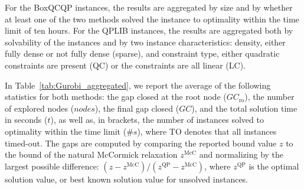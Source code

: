 \documentclass[twoside]{article}
\begin{document}
	For the BoxQCQP instances, the results are aggregated by size and by whether at least one of the two methods solved the instance to optimality within the time limit of ten hours.  For the QPLIB instances, the results are aggregated both by solvability of the instances and by two instance characteristics: density, either fully dense or not fully dense (sparse), and constraint type, either quadratic constraints are present (QC) or the constraints are all linear (LC).
	
	In Table~\ref{tab:Gurobi_aggregated}, %
	we report the average of the following  statistics for both methods: the gap closed at the root node ($GC_{\text{ro}}$), the number of explored nodes ($\textit{nodes}$), the final gap closed ($GC$), and the total solution time in seconds ($t$), as well as, in brackets, the number of instances solved to optimality within the time limit ($\#s$), where TO denotes that all instances timed-out.
	The gaps are computed by comparing the reported bound value $z$ to the bound of the natural McCormick relaxation $z^{\text{McC}}$ and normalizing by the largest possible difference: $(z - z^{\text{McC}})/(z^{\text{QP}} - z^{\text{McC}})$, where $z^{\text{QP}}$ is the optimal solution value, or best known solution value for unsolved instances.
	
\end{document}
